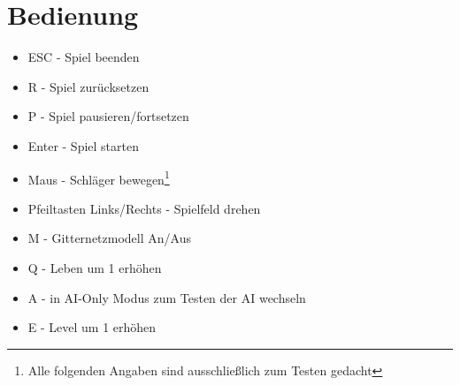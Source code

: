 \section{Bedienung}
\begin{itemize}
	\item ESC - Spiel beenden
	\item R - Spiel zurücksetzen
	\item P - Spiel pausieren/fortsetzen
	\item Enter - Spiel starten
	\item Maus - Schläger bewegen\footnote{Alle folgenden Angaben sind ausschließlich zum Testen gedacht}
	\item Pfeiltasten Links/Rechts - Spielfeld drehen
	\item M - Gitternetzmodell An/Aus
	\item Q - Leben um 1 erhöhen
	\item A - in AI-Only Modus zum Testen der AI wechseln
	\item E - Level um 1 erhöhen
\end{itemize}
